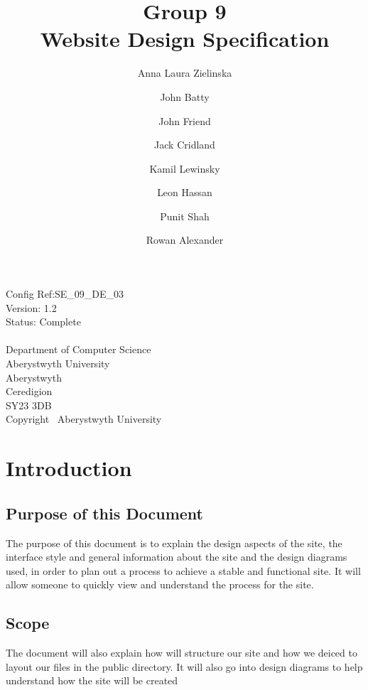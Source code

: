 \documentclass[12pt]{article}
\begin{document}
\title{Group 9 \protect\\ Website Design Specification}
\author{Anna Laura Zielinska \and John Batty \and John Friend \and Jack Cridland \and Kamil Lewinsky \and Leon Hassan \and Punit Shah \and Rowan Alexander}

 \maketitle
 \thispagestyle{headerfooter}
 \pagestyle{headerfooter}

  \begin{center}
 Config Ref:SE\_09\_DE\_03 \\
 Version: 1.2 \\
 Status: Complete\\
 ~\\
  Department of Computer Science\\
  Aberystwyth University\\
  Aberystwyth\\
  Ceredigion\\
  SY23 3DB\\
  Copyright \textcopyright~Aberystwyth University
 \end{center}

\clearpage

\tableofcontents
\clearpage

\section{Introduction}

  \subsection{Purpose of this Document}
    The purpose of this document is to explain the design aspects of the site, the interface style and general information about the site and the design diagrams used, in order to plan out a process to achieve a stable and functional site. It will allow someone to quickly view and understand the process for the site.

  \subsection{Scope}
    The document will also explain how will structure our site and how we deiced to layout our files in the public directory. It will also go into design diagrams to help understand how the site will be created
\end{document}
